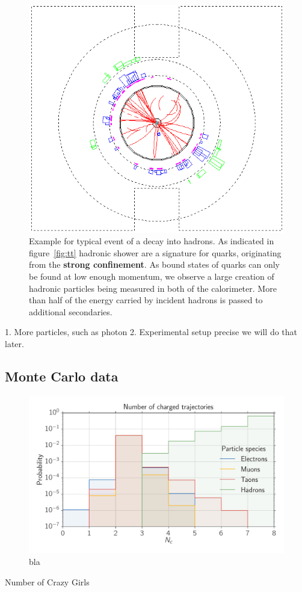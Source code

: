 \begin{figure}[htpb]
    \centering
    \includegraphics[width=0.8\linewidth]{figures/qq_02.png}
    \caption{Example for typical event of a decay into hadrons. As indicated in figure~\ref{fig:tt} hadronic shower are 
   a signature for quarks, originating from the \textbf{strong confinement}. 
   As bound states of quarks can only be found at low enough
   momentum, we observe a large creation of hadronic particles being
   measured in both of the calorimeter. More than half of
   the energy carried by incident hadrons is passed to additional secondaries. }
\label{fig:qq}
\end{figure}
1. More particles, such as photon
2. Experimental setup precise 
we will do that later.


\clearpage
\newpage
\subsection{Monte Carlo data}
\begin{figure}[htpb]
    \centering
    \includegraphics[width=1.1\linewidth]{figures/N_c_all}
    \caption{bla}
\label{fig:N_c_all}
\end{figure}
Number of Crazy Girls
